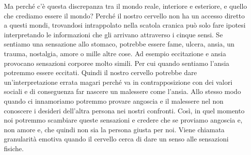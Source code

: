 \documentclass[12pt]{book} %
\begin{document}
Ma perché c'è questa discrepanza tra il mondo reale, interiore e esteriore, e quello che crediamo
essere il mondo? Perché il nostro cervello non ha un accesso diretto a questi mondi, trovandosi intrappolato nella
scatola cranica può solo fare ipotesi interpretando le informazioni che gli arrivano attraverso i cinque sensi. 
Se sentiamo una sensazione allo stomaco,
potrebbe essere fame, ulcera, ansia, un trauma, nostalgia, amore o mille altre cose. Ad esempio eccitazione e ansia
provocano sensazioni corporee molto simili. Per cui quando sentiamo l'ansia potremmo essere
eccitati. Quindi il nostro cervello potrebbe dare un'interpretazione errata magari perché va in contrapposizione con
dei valori sociali e di conseguenza far nascere un malessere come l'ansia. Allo stesso modo quando ci innamoriamo
potremmo provare angoscia e il malessere nel non conoscere i desideri dell'altra persona nei nostri confronti. 
Così, in quel momento noi potremmo scambiare queste sensazioni e credere che se proviamo angoscia e, non amore e, che quindi non sia la persona giusta per noi. Viene chiamata granularità emotiva quando il cervello cerca di dare un senso alle sensazioni 
fisiche. 
\end{document}
